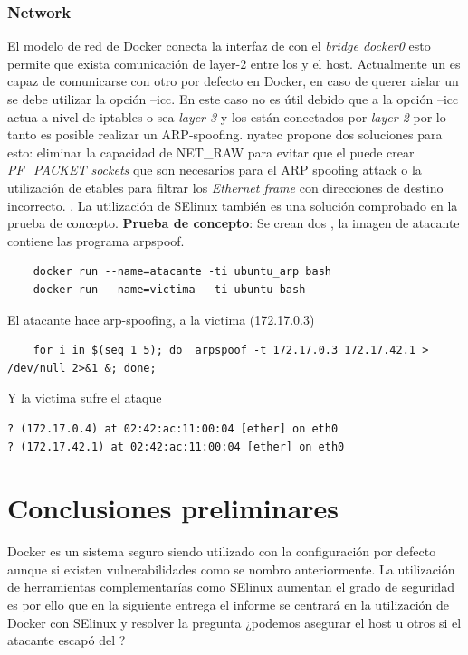 \documentclass[letter,10pt]{article}
\begin{document}
\subsubsection{Network}

El modelo de red de Docker conecta la interfaz de \container con el 
\emph{bridge docker0} esto permite que exista comunicación de layer-2 entre 
los \containers y el host. Actualmente un \container es capaz de comunicarse
con otro \container por defecto en Docker, en caso de querer aislar un 
\container se debe utilizar la opción --icc. En este caso no es útil debido que 
a la opción --icc actua a nivel de iptables o sea \emph{layer 3} y los 
\containers están conectados por \emph{layer 2} por lo tanto es posible realizar 
un ARP-spoofing. nyatec propone dos soluciones para esto: eliminar la capacidad 
de NET\_RAW para evitar que el \container puede crear \emph{PF\_PACKET sockets} 
que son necesarios para el ARP spoofing attack o la utilización de etables para 
filtrar los \emph{Ethernet frame} con direcciones de destino incorrecto. \cite{nyantec:2015:Online}.
La utilización de SElinux también es una solución comprobado en la prueba de concepto. 
\textbf{Prueba de concepto}:  Se crean dos \containers, la imagen de atacante contiene las programa arpspoof. 
\begin{verbatim}
	docker run --name=atacante -ti ubuntu_arp bash
	docker run --name=victima --ti ubuntu bash
\end{verbatim}

El atacante hace arp-spoofing, a la victima (172.17.0.3)
\begin{verbatim}
	for i in $(seq 1 5); do  arpspoof -t 172.17.0.3 172.17.42.1 > /dev/null 2>&1 &; done;
\end{verbatim}
Y la victima sufre el ataque
\begin{verbatim}
? (172.17.0.4) at 02:42:ac:11:00:04 [ether] on eth0
? (172.17.42.1) at 02:42:ac:11:00:04 [ether] on eth0
\end{verbatim}


\section{Conclusiones preliminares}
Docker es un sistema seguro siendo utilizado con la configuración por defecto aunque si existen vulnerabilidades como se nombro anteriormente. La utilización de herramientas complementarías como SElinux aumentan el grado de seguridad es por ello que en la siguiente entrega el informe se centrará en la utilización de Docker con SElinux y resolver la pregunta ¿podemos asegurar el host u otros \containers si el atacante escapó del \container?
\end{document}
